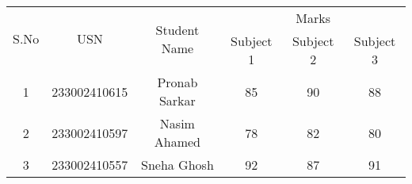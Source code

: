 \documentclass{article}
\begin{document}
\begin{table}[h!]
\centering
\begin{tabular}{|c|c|c|c|c|c|}
\hline
\multirow{2}{*}{S.No} & \multirow{2}{*}{USN} & \multirow{2}{*}{Student Name} & \multicolumn{3}{c|}{Marks} \\ \cline{4-6} 
                      &                      &                               & Subject 1 & Subject 2 & Subject 3 \\ \hline
1                     &  233002410615               & Pronab Sarkar                      & 85        & 90        & 88        \\ \hline
2                     & 233002410597                 & Nasim Ahamed                    & 78        & 82        & 80        \\ \hline
3                     & 233002410557               &  Sneha Ghosh                & 92        & 87        & 91        \\ \hline
\end{tabular}
\label{tab:student_marks}
\end{table}
\end{document}
